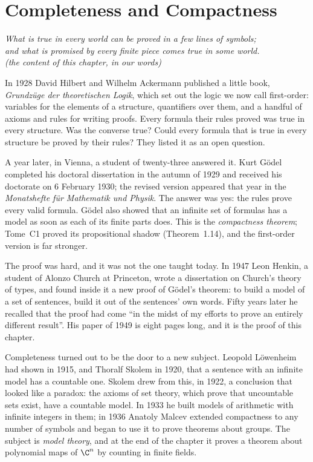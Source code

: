 \chapter{Completeness and Compactness}\label{ch:completeness}

\begin{center}\itshape
What is true in every world can be proved in a few lines of symbols;\\
and what is promised by every finite piece comes true in some world.\\
\upshape(the content of this chapter, in our words)
\end{center}

In 1928 David Hilbert and Wilhelm Ackermann published a little book, \emph{Grundzüge der theoretischen Logik}, which set out the logic we now call first-order: variables for the elements of a structure, quantifiers over them, and a handful of axioms and rules for writing proofs. Every formula their rules proved was true in every structure. Was the converse true? Could every formula that is true in every structure be proved by their rules? They listed it as an open question.

A year later, in Vienna, a student of twenty-three answered it. Kurt Gödel completed his doctoral dissertation in the autumn of 1929 and received his doctorate on 6 February 1930; the revised version appeared that year in the \emph{Monatshefte für Mathematik und Physik}. The answer was yes: the rules prove every valid formula. Gödel also showed that an infinite set of formulas has a model as soon as each of its finite parts does. This is the \emph{compactness theorem}; Tome~C1 proved its propositional shadow (Theorem~1.14), and the first-order version is far stronger.

The proof was hard, and it was not the one taught today. In 1947 Leon Henkin, a student of Alonzo Church at Princeton, wrote a dissertation on Church's theory of types, and found inside it a new proof of Gödel's theorem: to build a model of a set of sentences, build it out of the sentences' own words. Fifty years later he recalled that the proof had come ``in the midst of my efforts to prove an entirely different result''. His paper of 1949 is eight pages long, and it is the proof of this chapter.

Completeness turned out to be the door to a new subject. Leopold Löwenheim had shown in 1915, and Thoralf Skolem in 1920, that a sentence with an infinite model has a countable one. Skolem drew from this, in 1922, a conclusion that looked like a paradox: the axioms of set theory, which prove that uncountable sets exist, have a countable model. In 1933 he built models of arithmetic with infinite integers in them; in 1936 Anatoly Malcev extended compactness to any number of symbols and began to use it to prove theorems about groups. The subject is \emph{model theory}, and at the end of the chapter it proves a theorem about polynomial maps of $\C^n$ by counting in finite fields.

